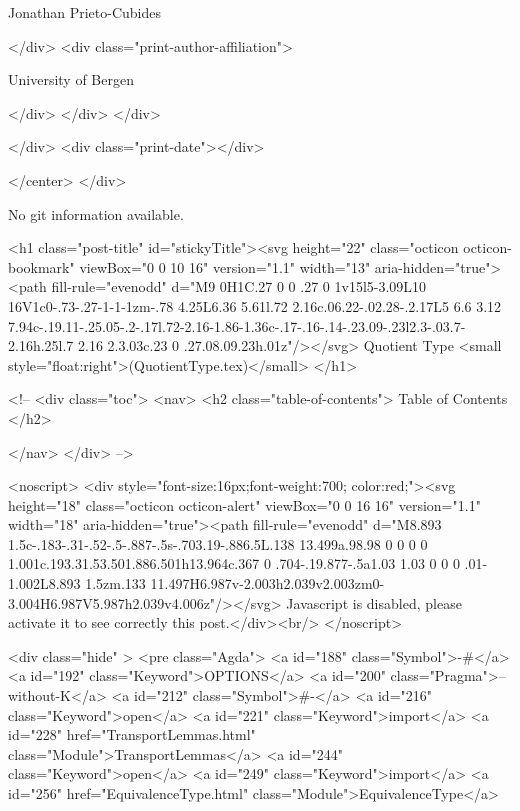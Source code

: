                  Jonathan Prieto-Cubides
                
              </div>
              <div class="print-author-affiliation">
                
                  University of Bergen
                
                </div>
            </div>
          </div>
          
          
        </div>
        <div class="print-date"></div>
        
        
    </center>
  </div>

  
  No git information available.
  

  <h1 class="post-title" id="stickyTitle"><svg height="22" class="octicon octicon-bookmark" viewBox="0 0 10 16" version="1.1" width="13" aria-hidden="true"><path fill-rule="evenodd" d="M9 0H1C.27 0 0 .27 0 1v15l5-3.09L10 16V1c0-.73-.27-1-1-1zm-.78 4.25L6.36 5.61l.72 2.16c.06.22-.02.28-.2.17L5 6.6 3.12 7.94c-.19.11-.25.05-.2-.17l.72-2.16-1.86-1.36c-.17-.16-.14-.23.09-.23l2.3-.03.7-2.16h.25l.7 2.16 2.3.03c.23 0 .27.08.09.23h.01z"/></svg> Quotient Type <small style="float:right">(QuotientType.tex)</small>
  </h1>

  <!-- 
  <div class="toc">
    <nav>
    <h2 class="table-of-contents"> Table of Contents </h2>
      

    </nav>
  </div>
   -->

  <noscript>
  <div style="font-size:16px;font-weight:700; color:red;"><svg height="18" class="octicon octicon-alert" viewBox="0 0 16 16" version="1.1" width="18" aria-hidden="true"><path fill-rule="evenodd" d="M8.893 1.5c-.183-.31-.52-.5-.887-.5s-.703.19-.886.5L.138 13.499a.98.98 0 0 0 0 1.001c.193.31.53.501.886.501h13.964c.367 0 .704-.19.877-.5a1.03 1.03 0 0 0 .01-1.002L8.893 1.5zm.133 11.497H6.987v-2.003h2.039v2.003zm0-3.004H6.987V5.987h2.039v4.006z"/></svg> Javascript is disabled, please activate it to see correctly this post.</div><br/>
  </noscript>

  <div class="hide" >
<pre class="Agda">
<a id="188" class="Symbol">{-#</a> <a id="192" class="Keyword">OPTIONS</a> <a id="200" class="Pragma">--without-K</a> <a id="212" class="Symbol">#-}</a>
<a id="216" class="Keyword">open</a> <a id="221" class="Keyword">import</a> <a id="228" href="TransportLemmas.html" class="Module">TransportLemmas</a>
<a id="244" class="Keyword">open</a> <a id="249" class="Keyword">import</a> <a id="256" href="EquivalenceType.html" class="Module">EquivalenceType</a>

